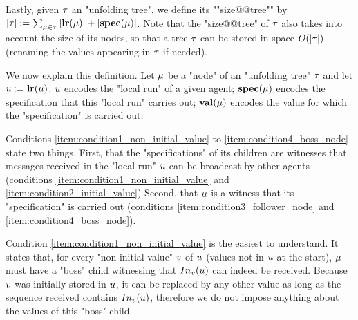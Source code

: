 Lastly, given $\tau$ an "unfolding tree", we define its ""size@@tree"" by $|\tau| := \sum_{\mu \in \tau} |\mathbf{lr}(\mu)| + |\mathbf{spec}(\mu)|$. Note that the "size@@tree" of $\tau$ also takes into account the size of its nodes, so that a tree $\tau$ can be stored in space $O(|\tau|)$ (renaming the values appearing in $\tau$ if needed). 


We now explain this definition. Let $\mu$ be a "node" of an "unfolding tree" $\tau$ and let $u := \mathbf{lr}(\mu)$. $u$ encodes the "local run" of a given agent; $\mathbf{spec}(\mu)$ encodes the specification that this "local run" carries out; $\mathbf{val}(\mu)$ encodes the value for which the "specification" is carried out.

Conditions \ref{item:condition1_non_initial_value} to \ref{item:condition4_boss_node} state two things. First, that the "specifications" of its children are witnesses that messages received in the "local run" $u$ can be broadcast by other agents (conditions \ref{item:condition1_non_initial_value} and \ref{item:condition2_initial_value})
Second, that $\mu$ is a witness that its "specification" is carried out (conditions \ref{item:condition3_follower_node} and \ref{item:condition4_boss_node}).

Condition \ref{item:condition1_non_initial_value} is the easiest to understand. It states that, for every "non-initial value" $v$ of $u$ (values not in $u$ at the start), $\mu$ must have a "boss" child witnessing that $\vinput{v}{\localrun}$ can indeed be received. Because $v$ was initially stored in $u$, it can be replaced by any other value as long as the sequence received contains $\vinput{v}{\localrun}$, therefore we do not impose anything about the values of this "boss" child. 

